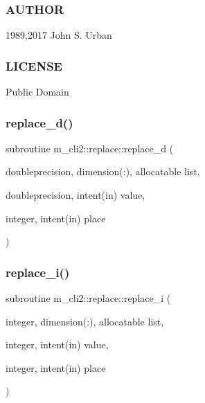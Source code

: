 \subsubsection*{A\+U\+T\+H\+OR}

1989,2017 John S. Urban \subsubsection*{L\+I\+C\+E\+N\+SE}

Public Domain \mbox{\label{interfacem__cli2_1_1replace_a606ded35a3f0d06cb61a28db82ab5ae7}} 
\subsubsection{\texorpdfstring{replace\+\_\+d()}{replace\_d()}}
{\footnotesize\ttfamily subroutine m\+\_\+cli2\+::replace\+::replace\+\_\+d (\begin{DoxyParamCaption}\item[{doubleprecision, dimension(\+:), allocatable}]{list,  }\item[{doubleprecision, intent(in)}]{value,  }\item[{integer, intent(in)}]{place }\end{DoxyParamCaption})\hspace{0.3cm}{\ttfamily [private]}}

\mbox{\label{interfacem__cli2_1_1replace_a73a0dab38328c3db8a7eef48e27390bd}} 
\subsubsection{\texorpdfstring{replace\+\_\+i()}{replace\_i()}}
{\footnotesize\ttfamily subroutine m\+\_\+cli2\+::replace\+::replace\+\_\+i (\begin{DoxyParamCaption}\item[{integer, dimension(\+:), allocatable}]{list,  }\item[{integer, intent(in)}]{value,  }\item[{integer, intent(in)}]{place }\end{DoxyParamCaption})\hspace{0.3cm}{\ttfamily [private]}}

